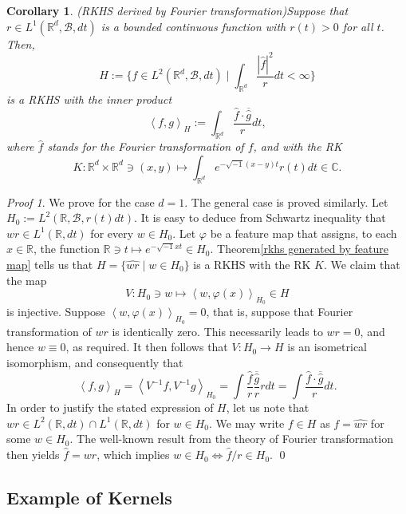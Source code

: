 \documentclass[a4paper,12pt]{article}
\newtheorem{cor}[thm]{Corollary}
\theoremstyle{remark}
\newtheorem*{prf}{Proof}
\theoremstyle{definition}
\theoremstyle{definition}
\theoremstyle{definition}
\newcommand{\ip}[2]{\left<#1, #2 \right>}
\begin{document}
\begin{cor}(RKHS derived by Fourier transformation)\label{rkhs by Fourier}
	Suppose that \( r \in L^1(\mathbb{R}^d, \mathscr{B}, dt) \) is a bounded continuous function with \( r(t) >0 \) for all \( t \).
	Then,
	\[
		H:= \{ f \in L^2(\mathbb{R}^d, \mathscr{B}, dt) \mid \int_{\mathbb{R}^d} \frac{|\hat{f}|^2}{r}   dt < \infty \}
	\]
	is a RKHS with the inner product
	\[
		\ip{f}{g}_H := \int_{\mathbb{R}^d} \frac{\hat{f} \cdot \overline{\hat{g}}}{r} dt,
	\]
	where \( \hat{f} \) stands for the Fourier transformation of \( f \), and with the RK
	\[
		K: \mathbb{R}^d \times \mathbb{R}^d \ni (x,y) \mapsto \int_{\mathbb{R}^d} e^{-\sqrt{-1}(x-y)t} r(t) dt \in \mathbb{C}.
	\]
\end{cor}
\begin{prf}
	We prove for the case \( d = 1 \). The general case is proved similarly.
	Let \( H_0 := L^2(\mathbb{R}, \mathscr{B}, r(t)dt) \). It is easy to deduce from Schwartz inequality that \( wr \in L^1(\mathbb{R}, dt) \) for every \( w \in H_0 \).
	Let \( \varphi \) be a feature map that assigns, to each \( x \in \mathbb{R} \), the function \( \mathbb{R} \ni t \mapsto e^{- \sqrt{-1}xt} \in H_0 \). Theorem\ref{rkhs generated by feature map} tells us that \( H = \{\widehat{wr} \mid w \in H_0\} \) is a RKHS with the RK \( K \). We claim that the map
	\[
		V: H_0 \ni w \mapsto \ip{w}{\varphi(x)}_{H_0} \in H
	\]
	is injective. Suppose \( \ip{w}{\varphi(x)}_{H_0} = 0 \), that is, suppose that Fourier transformation of \( wr \) is identically zero. This necessarily leads to \( wr = 0 \), and hence \(  w \equiv 0 \), as required.
	It then follows that \( V:H_0 \to H \) is an isometrical isomorphism, and consequently that
	\[
		\ip{f}{g}_H
		= \ip{V^{-1}f}{V^{-1}g}_{H_0}
		= \int \frac{\hat{f}}{r} \frac{\overline{\hat{g}}}{r} r dt
		= \int \frac{\hat{f} \cdot \overline{\hat{g}}}{r} dt.
	\]
	In order to justify the stated expression of \( H \), let us note that \( wr \in L^2(\mathbb{R}, dt)\cap L^1(\mathbb{R}, dt) \) for \( w \in H_0 \).
	We may write \( f \in H \) as \( f = \widehat{wr} \) for some \( w \in H_0 \).
	The well-known result from the theory of Fourier transformation then yields \( \hat{f} = wr \), which implies \( w \in H_0 \iff \hat{f}/r \in H_0 \).
	\qed\end{prf}

\subsection{Example of Kernels}
\end{document}
